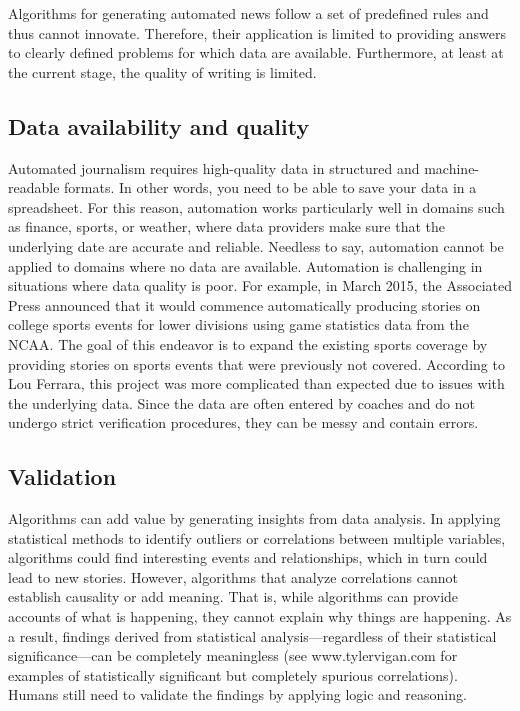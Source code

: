 \documentclass[notoc, symmetric, nobib, nols]{towcenter-book}
\begin{document}
Algorithms for generating automated news follow a set of predefined rules and thus cannot innovate. Therefore, their application is limited to providing answers to clearly defined problems for which data are available. Furthermore, at least at the current stage, the quality of writing is limited.  

\subsection{Data availability and quality}

Automated journalism requires high-quality data in structured and machine-readable formats. In other words, you need to be able to save your data in a spreadsheet. For this reason, automation works particularly well in domains such as finance, sports, or weather, where data providers make sure that the underlying date are accurate and reliable. Needless to say, automation cannot be applied to domains where no data are available. Automation is challenging in situations where data quality is poor. For example, in March 2015, the Associated Press announced that it would commence automatically producing stories on college sports events for lower divisions using game statistics data from the NCAA. The goal of this endeavor is to expand the existing sports coverage by providing stories on sports events that were previously not covered. According to Lou Ferrara, this project was more complicated than expected due to issues with the underlying data. Since the data are often entered by coaches and do not undergo strict verification procedures, they can be messy and contain errors. 

\subsection{Validation}

Algorithms can add value by generating insights from data analysis. In applying statistical methods to identify outliers or correlations between multiple variables, algorithms could find interesting events and relationships, which in turn could lead to new stories. However, algorithms that analyze correlations cannot establish causality or add meaning. That is, while algorithms can provide accounts of what is happening, they cannot explain why things are happening.\cite{lazer14} As a result, findings derived from statistical analysis---regardless of their statistical significance---can be completely meaningless (see www.tylervigan.com for examples of statistically significant but completely spurious correlations). Humans still need to validate the findings by applying logic and reasoning.\cite{latar15}
\end{document}
